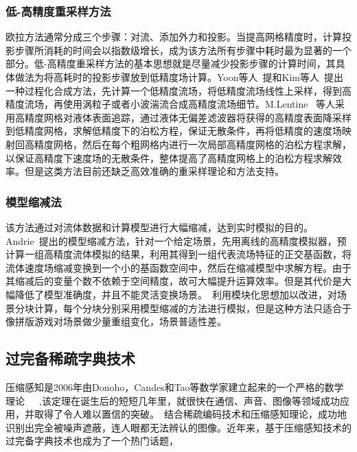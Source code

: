 \subsubsection{低-高精度重采样方法}
\label{sec:low-high-resampling}

欧拉方法通常分成三个步骤：对流、添加外力和投影。当提高网格精度时，计算投影步骤所消耗的时间会以指数级增长，成为该方法所有步骤中耗时最为显著的一个部分。低-高精度重采样方法的基本思想就是尽量减少投影步骤的计算时间，其具体做法为将高耗时的投影步骤放到低精度场计算。Yoon等人~\cite{yoon2009procedural}提和Kim等人~\cite{kim2008wavelet}提出一种过程化合成方法，先计算一个低精度流场，将低精度流场线性上采样，得到高精度流场，再使用涡粒子或者小波湍流合成高精度流场细节。M.Lentine ~\cite{lentine2010novel}等人采用高精度网格对液体表面追踪，通过液体无偏差滤波器将获得的高精度表面降采样到低精度网格，求解低精度下的泊松方程，保证无散条件，再将低精度的速度场映射回高精度网格，然后在每个粗网格内进行一次局部高精度网格的泊松方程求解，以保证高精度下速度场的无散条件，整体提高了高精度网格上的泊松方程求解效率。但是这类方法目前还缺乏高效准确的重采样理论和方法支持。

\subsubsection{模型缩减法}
\label{sec:ModelReduction}

该方法通过对流体数据和计算模型进行大幅缩减，达到实时模拟的目的。Andrie~\cite{treuille2006model}提出的模型缩减方法，针对一个给定场景，先用离线的高精度模拟器，预计算一组高精度流体模拟的结果，利用其得到一组代表流场特征的正交基函数，将流体速度场缩减变换到一个小的基函数空间中，然后在缩减模型中求解方程。由于其缩减后的变量个数不依赖于空间精度，故可大幅提升运算效率。但是其代价是大幅降低了模型准确度，并且不能灵活变换场景。~\cite{wicke2009modular}利用模块化思想加以改进，对场景分块计算，每个分块分别采用模型缩减的方法进行模拟，但是这种方法只适合于像拼版游戏对场景做少量重组变化，场景普适性差。

\subsection{过完备稀疏字典技术}
\label{sec:overcompleteDictionaries}

压缩感知是2006年由Donoho，Candes和Tao等数学家建立起来的一个严格的数学理论~\cite{candes2006near}~\cite{donoho2006compressed}~\cite{candes2008introduction},该定理在诞生后的短短几年里，就很快在通信、声音、图像等领域成功应用，并取得了令人难以置信的突破。~\cite{kroeker2009face}结合稀疏编码技术和压缩感知理论，成功地识别出完全被噪声遮蔽，连人眼都无法辨认的图像。近年来，基于压缩感知技术的过完备字典技术也成为了一个热门话题，

